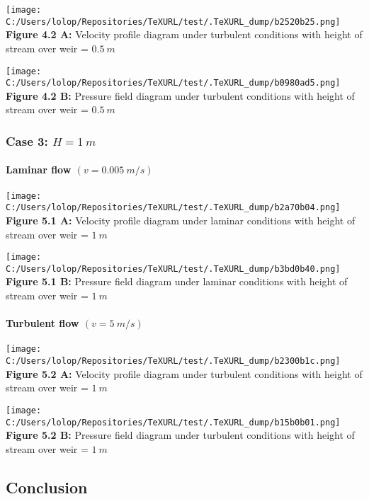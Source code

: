 \documentclass[11pt]{article}
\begin{document}
\texttt{[image: C:/Users/lolop/Repositories/TeXURL/test/.TeXURL\_dump/b2520b25.png]} \textbf{Figure 4.2 A:}
Velocity profile diagram under turbulent conditions with height of
stream over weir = \(0.5\ m\)

\texttt{[image: C:/Users/lolop/Repositories/TeXURL/test/.TeXURL\_dump/b0980ad5.png]} \textbf{Figure 4.2 B:}
Pressure field diagram under turbulent conditions with height of stream
over weir = \(0.5\ m\)

\hypertarget{case-3-h-1-m-1}{%
\subsubsection{\texorpdfstring{Case 3:
\(H = 1\ m\)}{Case 3: H = 1\textbackslash{} m}}\label{case-3-h-1-m-1}}

\hypertarget{laminar-flow-v-0.005-ms-2}{%
\paragraph{\texorpdfstring{Laminar flow
\((v = 0.005\ m/s)\)}{Laminar flow (v = 0.005\textbackslash{} m/s)}}\label{laminar-flow-v-0.005-ms-2}}

\texttt{[image: C:/Users/lolop/Repositories/TeXURL/test/.TeXURL\_dump/b2a70b04.png]} \textbf{Figure 5.1 A:}
Velocity profile diagram under laminar conditions with height of stream
over weir = \(1\ m\)

\texttt{[image: C:/Users/lolop/Repositories/TeXURL/test/.TeXURL\_dump/b3bd0b40.png]} \textbf{Figure 5.1 B:}
Pressure field diagram under laminar conditions with height of stream
over weir = \(1\ m\)

\hypertarget{turbulent-flow-v-5-ms-2}{%
\paragraph{\texorpdfstring{Turbulent flow
\((v = 5\ m/s)\)}{Turbulent flow (v = 5\textbackslash{} m/s)}}\label{turbulent-flow-v-5-ms-2}}

\texttt{[image: C:/Users/lolop/Repositories/TeXURL/test/.TeXURL\_dump/b2300b1c.png]} \textbf{Figure 5.2 A:}
Velocity profile diagram under turbulent conditions with height of
stream over weir = \(1\ m\)

\texttt{[image: C:/Users/lolop/Repositories/TeXURL/test/.TeXURL\_dump/b15b0b01.png]} \textbf{Figure 5.2 B:}
Pressure field diagram under turbulent conditions with height of stream
over weir = \(1\ m\)

\hypertarget{conclusion}{%
\subsection{Conclusion}\label{conclusion}}
\end{document}
